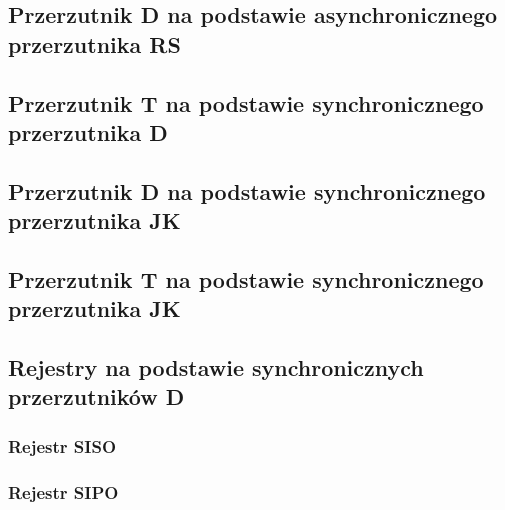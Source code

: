 \documentclass[12pt,a4paper]{article}
\begin{document}
\subsection{Przerzutnik D na podstawie asynchronicznego przerzutnika RS}

\subsection{Przerzutnik T na podstawie synchronicznego przerzutnika D}

\subsection{Przerzutnik D na podstawie synchronicznego przerzutnika JK}

\subsection{Przerzutnik T na podstawie synchronicznego przerzutnika JK}

\subsection{Rejestry na podstawie synchronicznych przerzutników D}
\subsubsection{Rejestr SISO}

\subsubsection{Rejestr SIPO}
\end{document}
